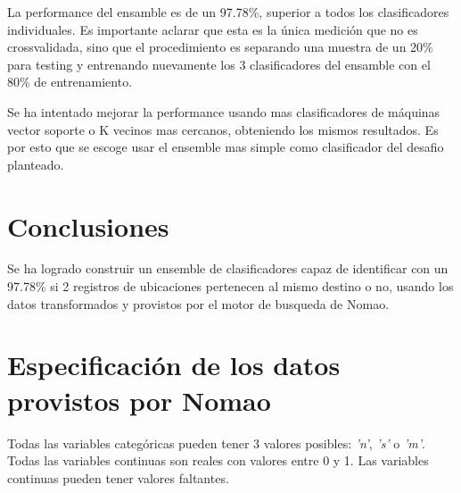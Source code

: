 \documentclass[journal]{IEEEtran}
\begin{document}
La performance del ensamble es de un 97.78\%, superior a todos los
clasificadores individuales. Es importante aclarar
que esta es la única medición que no es crossvalidada, sino que el 
procedimiento es separando una muestra de un 20\% para testing y
entrenando nuevamente los 3 clasificadores del ensamble con el 80\%
de entrenamiento.

Se ha intentado mejorar la performance usando mas clasificadores de
máquinas vector soporte o K vecinos mas cercanos, obteniendo los
mismos resultados. Es por esto que se escoge usar el ensemble
mas simple como clasificador del desafio planteado.


\section{Conclusiones}
Se ha logrado construir un ensemble de clasificadores capaz de identificar
con un 97.78\% si 2 registros de ubicaciones pertenecen al mismo destino o no,
usando los datos transformados y provistos por el motor de busqueda de Nomao.



\appendices

\section{Especificación de los datos provistos por Nomao}
\label{appendix1}
Todas las variables categóricas pueden tener 3 valores posibles:
\textit{'n'}, \textit{'s'} o \textit{'m'}.
Todas las variables continuas son reales con valores entre 
0 y 1. Las variables continuas pueden tener valores faltantes.
\end{document}
